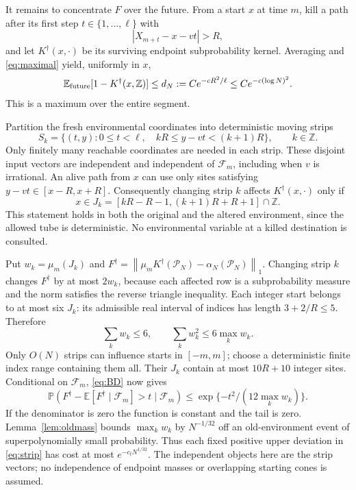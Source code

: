 \documentclass[11pt]{article}
\newcommand{\EE}{\mathbb E}
\newcommand{\PP}{\mathbb P}
\newcommand{\ZZ}{\mathbb Z}
\newcommand{\cF}{\mathcal F}
\newcommand{\cP}{\mathcal P}
\newcommand{\norm}[1]{\left\lVert#1\right\rVert_1}
\begin{document}
It remains to concentrate $F$ over the future. From a start $x$
at time $m$, kill a path after its first step $t\in\{1,\ldots,\ell\}$
with
\[
                   |X_{m+t}-x-vt|>R,
\]
and let $K^\dagger(x,\cdot)$ be its surviving endpoint
subprobability kernel. Averaging and \eqref{eq:maximal} yield,
uniformly in $x$,
\begin{equation}\label{eq:killedmean}
 \EE_{\rm future}[1-K^\dagger(x,\ZZ)]
       \leq d_N:=Ce^{-cR^2/\ell}\leq Ce^{-c(\log N)^2}.
\end{equation}
This is a maximum over the entire segment.

Partition the fresh environmental coordinates into deterministic
moving strips
\[
 S_k=\{(t,y):0\leq t<\ell,\quad kR\leq y-vt<(k+1)R\},
                                  \qquad k\in\ZZ.
\]
Only finitely many reachable coordinates are needed in each strip.
These disjoint input vectors are independent and independent of
$\cF_m$, including when $v$ is irrational.
An alive path from $x$ can use only sites satisfying
$y-vt\in[x-R,x+R]$.
Consequently changing strip $k$ affects $K^\dagger(x,\cdot)$
only if
\[
            x\in J_k=[kR-R-1,(k+1)R+R+1]\cap\ZZ.
\]
This statement holds in both the original and the altered environment,
since the allowed tube is deterministic. No environmental variable at
a killed destination is consulted.

Put $w_k=\mu_m(J_k)$ and
$F^\dagger=\norm{\mu_mK^\dagger(\cP_N)-\alpha_N(\cP_N)}$.
Changing strip $k$ changes $F^\dagger$ by at most $2w_k$,
because each affected row is a subprobability measure and the norm
satisfies the reverse triangle inequality.
Each integer start belongs to at most six $J_k$: its admissible
real interval of indices has length $3+2/R\leq5$.
Therefore
\[
             \sum_kw_k\leq6,\qquad
             \sum_kw_k^2\leq6\max_kw_k.
\]
Only $O(N)$ strips can influence starts in $[-m,m]$;
choose a deterministic finite index range containing them all.
Their $J_k$ contain at most $10R+10$ integer sites.
Conditional on $\cF_m$, \eqref{eq:BD} now gives
\begin{equation}\label{eq:strip}
 \PP(F^\dagger-\EE[F^\dagger\mid\cF_m]>t\mid\cF_m)
        \leq\exp\{-t^2/(12\max_kw_k)\}.
\end{equation}
If the denominator is zero the function is constant and the tail
is zero. Lemma~\ref{lem:oldmass} bounds $\max_kw_k$ by
$N^{-1/32}$ off an old-environment event of superpolynomially
small probability. Thus each fixed positive upper deviation in
\eqref{eq:strip} has cost at most $e^{-c_tN^{1/32}}$.
The independent objects here are the strip vectors; no independence
of endpoint masses or overlapping starting cones is assumed.
\end{document}
